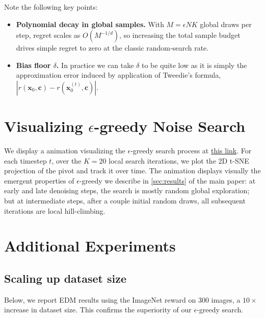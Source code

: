 \documentclass{article}
\begin{document}
Note the following key points:
\begin{itemize}
    \item \textbf{Polynomial decay in global samples.} With $M = \epsilon NK$ global draws per step, regret scales as $O(M^{-1/d})$, so increasing the total sample budget drives simple regret to zero at the classic random‑search rate.
    \item \textbf{Bias floor $\delta$.} In practice we can take $\delta$
 to be quite low as it is simply the approximation error induced by application of Tweedie's formula, $|r(\mathbf{x}_0, \mathbf{c}) - r(\hat{\mathbf{x}}^{(t)}_0, \mathbf{c})|$.
\end{itemize}

\section{Visualizing $\epsilon$-greedy Noise Search}

We display a animation visualizing the $\epsilon$-greedy search process at \href{https://diffusion-tts.netlify.app/}{this link}. For each timestep $t$, over the $K = 20$ local search iterations, we plot the 2D t-SNE \citep{JMLR:v9:vandermaaten08a} projection of the pivot and track it over time. The animation displays visually the emergent properties of $\epsilon$-greedy we describe in \autoref{sec:results} of the main paper: at early and late denoising steps, the search is mostly random global exploration; but at intermediate steps, after a couple initial random draws, all subsequent iterations are local hill-climbing.



\section{Additional Experiments}
\label{app:more}

\subsection{Scaling up dataset size}

Below, we report EDM results using the ImageNet reward on $300$ images, a $10\times$ increase in dataset size. 
This confirms the superiority of our $\epsilon$-greedy search.
\end{document}

